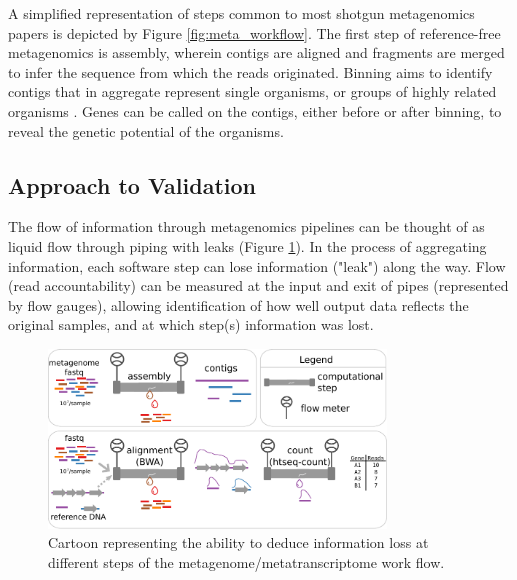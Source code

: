 A simplified representation of steps common to most shotgun metagenomics papers is depicted by Figure \ref{fig:meta_workflow}.
The first step of reference-free metagenomics is assembly, wherein contigs are aligned and fragments are merged to infer the sequence from which the reads originated.
Binning aims to identify contigs that in aggregate represent single organisms, or groups of highly related organisms \cite{kunin2008}.
Genes can be called on the contigs, either before or after binning, to reveal the genetic potential of the organisms.

\subsection{Approach to Validation}
\label{subsection_pipe_leaks}
The flow of information through metagenomics pipelines can be thought of as liquid flow through piping with leaks (Figure \ref{fig:pipe_leaks}).
In the process of aggregating information, each software step can lose information ("leak") along the way.
Flow (read accountability) can be measured at the input and exit of pipes (represented by flow gauges), allowing identification of how well output data reflects the original samples, and at which step(s) information was lost.

\begin{figure}[H]
\centering
    \includegraphics[width=0.8\textwidth]{./tex/chapter2/figures/170312_pipe_leaks.pdf}
    \begin{singlespace}
    \caption[Framework for assessing information loss in workflow steps]{
        Cartoon representing the ability to deduce information loss at different steps of the metagenome/metatranscriptome work flow.}
    \label{fig:pipe_leaks}
    \end{singlespace}
\end{figure}


